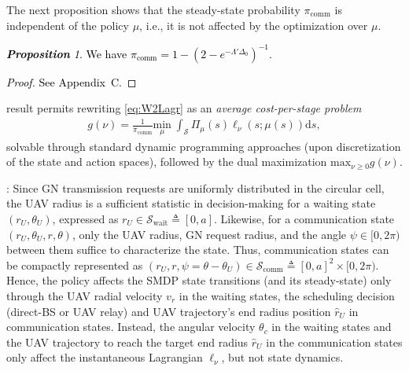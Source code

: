 \documentclass[10pt, twocolumn]{IEEEtran}
\theoremstyle{plain}
\theoremstyle{definition}
\theoremstyle{remark}
\newtheorem{prop}{\textbf{Proposition}}
\newcommand\hlt[1]{\textcolor{black}{#1}}
\begin{document}
The next proposition shows that the steady-state probability $\pi_{\mathrm{comm}}$ is independent of the policy $\mu$, i.e., it is not affected by the optimization over $\mu$.
\hlt{\begin{prop}\label{P3}
We have
$\pi_{\mathrm{comm}}{=}1-(2{-}e^{-\Lambda'\Delta_{0}})^{-1}$.
\end{prop}
\begin{proof}    See Appendix~C.\end{proof}
}
 result permits rewriting \eqref{eq:W2Lagr} as an \emph{average cost-per-stage problem}
\begin{align}\label{eq:TotalGMin}
	g(\nu) = \frac{1}{\pi_{\mathrm{comm}}}\underset{\mu}{\mathrm{min}} \; \int_{\mathcal{S}} \Pi_{\mu}(s) \ell_\nu(s; \mu(s))\mathrm d s,
\end{align}
solvable through standard dynamic programming approaches (upon discretization of the state and action spaces), followed by the dual maximization $\mathrm{max}_{\nu{\geq}0}g(\nu)$.

: Since GN transmission requests are uniformly distributed in the circular cell, the UAV radius is a sufficient statistic in decision-making for a waiting state $(r_{U},\theta_{U})$, expressed as $r_{U}{\in}\mathcal{S}_{\mathrm{wait}}\triangleq[0,a]$. Likewise, for a communication state $(r_{U},\theta_{U},r,\theta)$, only the UAV radius, GN request radius, and the angle $\psi{\in}[0,2\pi)$ between them suffice to characterize the state. Thus, communication states can be compactly represented as $(r_{U},r,\psi{=}\theta{-}\theta_U){\in}\mathcal{S}_{\mathrm{comm}}\triangleq[0,a]^2{\times}[0, 2\pi)$. Hence, the policy affects the SMDP state transitions (and its steady-state) only through the UAV radial velocity $v_{r}$ in the waiting states, the
scheduling decision (direct-BS or UAV relay) and
 UAV trajectory's end radius position $\hat{r}_{U}$ in communication states. Instead, the angular velocity $\theta_{c}$ in the waiting states and the UAV trajectory to reach the target end radius $\hat{r}_{U}$ in the communication states
  only affect the instantaneous Lagrangian $\ell_{\nu}$, but not
 state dynamics.
\end{document}
